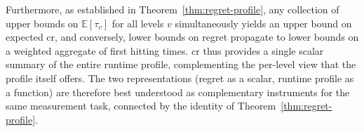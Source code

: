 Furthermore, as established in Theorem~\ref{thm:regret-profile}, any
collection of
upper bounds on $\mathbb{E}[\tau_v]$ for all levels $v$
simultaneously yields an upper
bound on expected \acrshort{cr}, and conversely, lower bounds on
regret propagate to
lower bounds on a weighted aggregate of first hitting times.
\acrshort{cr} thus
provides a single scalar summary of the entire runtime profile,
complementing the
per-level view that the profile itself offers. The two
representations (regret as a
scalar, runtime profile as a function) are therefore best understood
as complementary
instruments for the same measurement task, connected by the identity of
Theorem~\ref{thm:regret-profile}.

